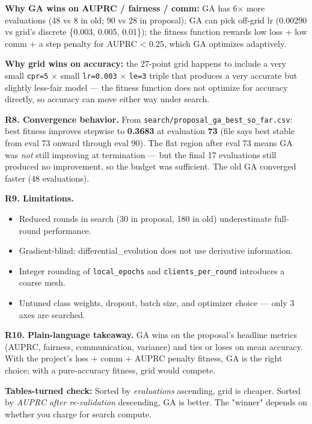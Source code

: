 \documentclass{article}
\begin{document}
\textbf{Why GA wins on AUPRC / fairness / comm:} GA has 6\ensuremath{\times} more evaluations (48 vs 8 in old; 90 vs 28 in proposal); GA can pick off-grid lr (0.00290 vs grid's discrete \{0.003, 0.005, 0.01\}); the fitness function rewards low loss + low comm + a step penalty for AUPRC < 0.25, which GA optimizes adaptively.


\textbf{Why grid wins on accuracy:} the 27-point grid happens to include a very small \texttt{cpr=5} \ensuremath{\times} small \texttt{lr=0.003} \ensuremath{\times} \texttt{le=3} triple that produces a very accurate but slightly less-fair model --- the fitness function does not optimize for accuracy directly, so accuracy can move either way under search.


\textbf{R8. Convergence behavior.} From \texttt{search/proposal\_ga\_best\_so\_far.csv}: best fitness improves stepwise to \textbf{0.3683} at evaluation \textbf{73} (file says best stable from eval 73 onward through eval 90). The flat region after eval 73 means GA was \emph{not} still improving at termination --- but the final 17 evaluations still produced no improvement, so the budget was sufficient. The old GA converged faster (48 evaluations).


\textbf{R9. Limitations.}

\begin{itemize}[leftmargin=1.4em,itemsep=2pt,topsep=2pt]
  \item Reduced rounds in search (30 in proposal, 180 in old) underestimate full-round performance.
  \item Gradient-blind: differential\_evolution does not use derivative information.
  \item Integer rounding of \texttt{local\_epochs} and \texttt{clients\_per\_round} introduces a coarse mesh.
  \item Untuned class weights, dropout, batch size, and optimizer choice --- only 3 axes are searched.
\end{itemize}


\textbf{R10. Plain-language takeaway.} GA wins on the proposal's headline metrics (AUPRC, fairness, communication, variance) and ties or loses on mean accuracy. With the project's loss + comm + AUPRC penalty fitness, GA is the right choice; with a pure-accuracy fitness, grid would compete.


\textbf{Tables-turned check:} Sorted by \emph{evaluations} ascending, grid is cheaper. Sorted by \emph{AUPRC after re-validation} descending, GA is better. The "winner" depends on whether you charge for search compute.
\end{document}
